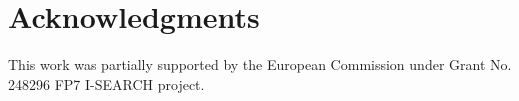 \documentclass{acm_proc_article-sp}
\begin{document}

\section*{Acknowledgments}

This work was partially supported by the European Commission under Grant No. 248296 FP7 \mbox{I-SEARCH} project.




\balancecolumns
\end{document}
